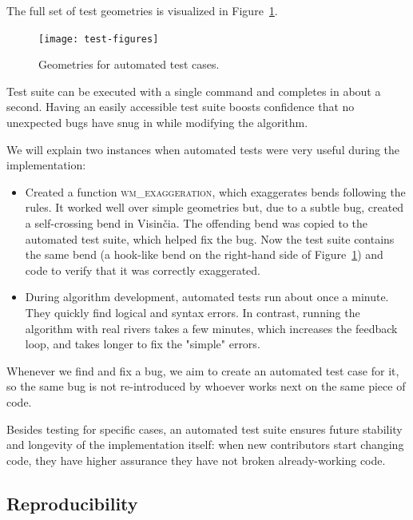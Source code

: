 \documentclass[a4paper]{article}
\begin{document}
The full set of test geometries is visualized in Figure~\ref{fig:test-figures}.

\begin{figure}[ht]
    \centering
    \texttt{[image: test-figures]}
    \caption{Geometries for automated test cases.}
    \label{fig:test-figures}
\end{figure}

Test suite can be executed with a single command and completes in about a
second. Having an easily accessible test suite boosts confidence that no
unexpected bugs have snug in while modifying the algorithm.

We will explain two instances when automated tests were very useful during
the implementation:
\begin{itemize}

    \item Created a function \textsc{wm\_exaggeration}, which exaggerates bends
        following the rules. It worked well over simple geometries but, due to
        a subtle bug, created a self-crossing bend in Visinčia. The offending
        bend was copied to the automated test suite, which helped fix the bug.
        Now the test suite contains the same bend (a hook-like bend on the
        right-hand side of Figure~\ref{fig:test-figures}) and code to verify
        that it was correctly exaggerated.

    \item During algorithm development, automated tests run about once a
        minute. They quickly find logical and syntax errors. In contrast,
        running the algorithm with real rivers takes a few minutes, which
        increases the feedback loop, and takes longer to fix the "simple"
        errors.

\end{itemize}

Whenever we find and fix a bug, we aim to create an automated test case for it,
so the same bug is not re-introduced by whoever works next on the same piece of
code.

Besides testing for specific cases, an automated test suite ensures future
stability and longevity of the implementation itself: when new contributors
start changing code, they have higher assurance they have not broken
already-working code.

\subsection{Reproducibility}
\label{sec:reproducing-the-paper}
\end{document}
